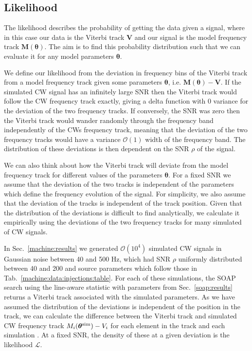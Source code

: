 %
%
\subsection{\label{par_est:bayes:likelihood}Likelihood}
%
%

The likelihood describes the probability of getting the data given a signal, where in this case our data is the Viterbi track $\bm{V}$ and our signal is the model frequency track $\bm{M}(\bm{\theta})$. 
The aim is to find this probability distribution such that we can evaluate it for any model parameters $\bm{\theta}$.

We define our likelihood from the deviation in frequency bins of the Viterbi track from a model frequency track given some parameters $\bm{\theta}$, i.e. $\bm{M}(\bm{\theta}) - \bm{V}$.
If the simulated \gls{CW} signal has an infinitely large \gls{SNR}
then the Viterbi track would follow the \gls{CW} frequency track exactly, giving a delta function with 0 variance for the deviation of the two frequency tracks. If conversely, the \gls{SNR} was zero then the Viterbi track would
wander randomly through the frequency band independently of the \glspl{CW} frequency track,
meaning that the deviation of the two frequency tracks would have a variance $\mathcal{O}(1)$ width of the frequency band.
The distribution of these deviations is then dependent on the \gls{SNR} $\rho$ of the signal.  

We can also think about how the Viterbi track will deviate from the model frequency track for different values of the parameters $\bm{\theta}$.
For a fixed \gls{SNR} we assume that the deviation of the two tracks is independent of the parameters which define the frequency evolution of the signal. 
For simplicity, we also assume that the deviation of the tracks is independent of the track position.
Given that the distribution of the deviations is difficult to find analytically, we calculate it empirically using the deviations of the two frequency tracks for many simulated of \gls{CW} signals. 

In Sec.~\ref{machine:results} we generated $\mathcal{O}(10^{4})$ simulated
\gls{CW} signals in Gaussian noise between 40 and 500 Hz, which had \gls{SNR}
$\rho$ uniformly distributed between 40 and 200 and
source parameters which follow those in
Tab.~\ref{machine:data:injections:table}. For each of these simulations, the
SOAP search using the line-aware statistic with parameters from
Sec.~\ref{soap:results} returns a Viterbi track associated with the simulated
parameters.  As we have assumed the distribution of the deviations is independent of the position in the track, we can calculate the difference between the Viterbi track and simulated \gls{CW} frequency track $M_i(\bm{\theta}^{\rm{sim}}) - V_i$ for each
element in the track and each simulation .
At a fixed \gls{SNR}, the density of these at a given deviation is the likelihood $\mathcal{L}$. 

